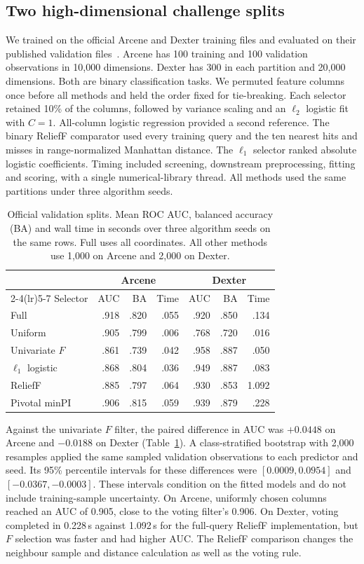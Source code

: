 \subsection{Two high-dimensional challenge splits}
\label{sec:official}
We trained on the official Arcene and Dexter training files and evaluated on their published validation files~\citep{guyon2004challenge}. Arcene has 100 training and 100 validation observations in 10,000 dimensions. Dexter has 300 in each partition and 20,000 dimensions. Both are binary classification tasks. We permuted feature columns once before all methods and held the order fixed for tie-breaking. Each selector retained 10\% of the columns, followed by variance scaling and an $\ell_2$ logistic fit with $C=1$. All-column logistic regression provided a second reference. The binary ReliefF comparator used every training query and the ten nearest hits and misses in range-normalized Manhattan distance. The $\ell_1$ selector ranked absolute logistic coefficients. Timing included screening, downstream preprocessing, fitting and scoring, with a single numerical-library thread. All methods used the same partitions under three algorithm seeds.

\begin{table}[tb]
\centering
\caption{Official validation splits. Mean ROC AUC, balanced accuracy (BA) and wall time in seconds over three algorithm seeds on the same rows. Full uses all coordinates. All other methods use 1,000 on Arcene and 2,000 on Dexter.}
\label{tab:external}
\begin{tabular}{lrrrrrr}
\toprule
&\multicolumn{3}{c}{Arcene}&\multicolumn{3}{c}{Dexter}\\
\cmidrule(lr){2-4}\cmidrule(lr){5-7}
Selector&AUC&BA&Time&AUC&BA&Time\\
\midrule
Full                    &.918&.820&.055&.920&.850&.134\\
Uniform                 &.905&.799&.006&.768&.720&.016\\
Univariate $F$          &.861&.739&.042&.958&.887&.050\\
$\ell_1$ logistic       &.868&.804&.036&.949&.887&.083\\
ReliefF                 &.885&.797&.064&.930&.853&1.092\\
Pivotal minPI           &.906&.815&.059&.939&.879&.228\\
\bottomrule
\end{tabular}
\end{table}

Against the univariate $F$ filter, the paired difference in AUC was $+0.0448$ on Arcene and $-0.0188$ on Dexter (Table~\ref{tab:external}). A class-stratified bootstrap with 2,000 resamples applied the same sampled validation observations to each predictor and seed. Its 95\% percentile intervals for these differences were $[0.0009,0.0954]$ and $[-0.0367,-0.0003]$. These intervals condition on the fitted models and do not include training-sample uncertainty. On Arcene, uniformly chosen columns reached an AUC of 0.905, close to the voting filter's 0.906. On Dexter, voting completed in 0.228\,s against 1.092\,s for the full-query ReliefF implementation, but $F$ selection was faster and had higher AUC. The ReliefF comparison changes the neighbour sample and distance calculation as well as the voting rule.
